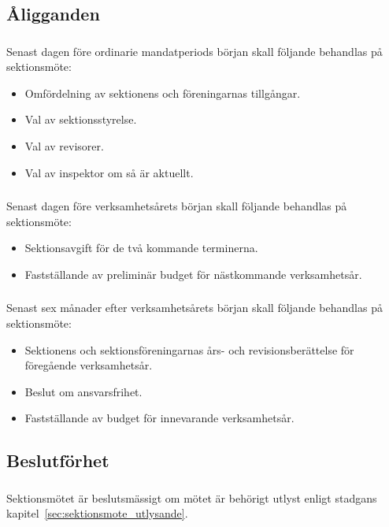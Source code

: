 \documentclass[a4paper, 10pt]{article}
\begin{document}
\subsection{Åligganden}
\subsubsection{}
Senast dagen före ordinarie mandatperiods början skall följande behandlas på sektionsmöte:
\begin{itemize}
\item Omfördelning av sektionens och föreningarnas tillgångar.
\item Val av sektionsstyrelse.
\item Val av revisorer.
\item Val av inspektor om så är aktuellt.
\end{itemize}
\subsubsection{}
Senast dagen före verksamhetsårets början skall följande behandlas på sektionsmöte:
\begin{itemize}
\item Sektionsavgift för de två kommande terminerna.
\item Fastställande av preliminär budget för nästkommande verksamhetsår.
\end{itemize}
\subsubsection{}
Senast sex månader efter verksamhetsårets början skall följande behandlas på sektionsmöte:
\begin{itemize}
\item Sektionens och sektionsföreningarnas års- och revisionsberättelse för föregående verksamhetsår.
\item Beslut om ansvarsfrihet.
\item Fastställande av budget för innevarande verksamhetsår.
\end{itemize}
\subsection{Beslutförhet}
\subsubsection{}
Sektionsmötet är beslutsmässigt om mötet är behörigt utlyst enligt stadgans kapitel~\ref{sec:sektionsmote_utlysande}.
\end{document}
